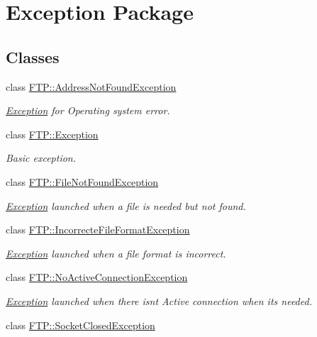 \hypertarget{group__exception}{}\section{Exception Package}
\label{group__exception}
\subsection*{Classes}
\begin{DoxyCompactItemize}
\item 
class \hyperlink{classFTP_1_1AddressNotFoundException}{F\+T\+P\+::\+Address\+Not\+Found\+Exception}
\begin{DoxyCompactList}\small\item\em \hyperlink{classFTP_1_1Exception}{Exception} for Operating system error. \end{DoxyCompactList}\item 
class \hyperlink{classFTP_1_1Exception}{F\+T\+P\+::\+Exception}
\begin{DoxyCompactList}\small\item\em Basic exception. \end{DoxyCompactList}\item 
class \hyperlink{classFTP_1_1FileNotFoundException}{F\+T\+P\+::\+File\+Not\+Found\+Exception}
\begin{DoxyCompactList}\small\item\em \hyperlink{classFTP_1_1Exception}{Exception} launched when a file is needed but not found. \end{DoxyCompactList}\item 
class \hyperlink{classFTP_1_1IncorrecteFileFormatException}{F\+T\+P\+::\+Incorrecte\+File\+Format\+Exception}
\begin{DoxyCompactList}\small\item\em \hyperlink{classFTP_1_1Exception}{Exception} launched when a file format is incorrect. \end{DoxyCompactList}\item 
class \hyperlink{classFTP_1_1NoActiveConnectionException}{F\+T\+P\+::\+No\+Active\+Connection\+Exception}
\begin{DoxyCompactList}\small\item\em \hyperlink{classFTP_1_1Exception}{Exception} launched when there isn\textquotesingle{}t Active connection when it\textquotesingle{}s needed. \end{DoxyCompactList}\item 
class \hyperlink{classFTP_1_1SocketClosedException}{F\+T\+P\+::\+Socket\+Closed\+Exception}

\end{DoxyCompactItemize}
